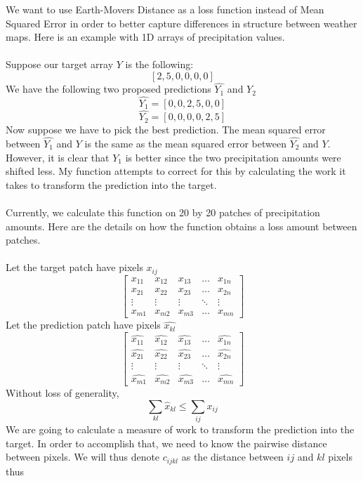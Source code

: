 \documentclass[twoside,11pt]{article}
\theoremstyle{definition}
\begin{document}
We want to use Earth-Movers Distance as a loss function instead of Mean Squared Error in order to better capture differences in structure between weather maps. Here is an example with 1D arrays of precipitation values. \\
\\
Suppose our target array $Y$ is the following:
\[
[2,5,0,0,0,0]
\]
We have the following two proposed predictions $\hat{Y_1}$ and $\hat{Y_2}$
\[
\hat{Y_1} =[0,0,2,5,0,0]
\]
\[
\hat{Y_2} = [0,0,0,0,2,5]
\]
Now suppose we have to pick the best prediction. The mean squared error between $\hat{Y_1}$ and $Y$ is the same as the mean squared error between  $\hat{Y_2}$ and $Y$. However, it is clear that $Y_1$ is better since the two precipitation amounts were shifted less. My function attempts to correct for this by calculating the work it takes to transform the prediction into the target. \\
\\
Currently, we calculate this function on 20 by 20 patches of precipitation amounts. Here are the details on how the function obtains a loss amount between patches.\\
\\
Let the target patch have pixels $x_{ij}$\\
\[
\begin{bmatrix}
    x_{11} & x_{12} & x_{13} & \dots  & x_{1n} \\
    x_{21} & x_{22} & x_{23} & \dots  & x_{2n} \\
    \vdots & \vdots & \vdots & \ddots & \vdots \\
    x_{m1} & x_{m2} & x_{m3} & \dots  & x_{mn}
\end{bmatrix}
\]
Let the prediction patch have pixels $\hat{x_{kl}}$\\
\[
\begin{bmatrix}
    \hat{x_{11}} & \hat{x_{12}} & \hat{x_{13}} & \dots  & \hat{x_{1n}} \\
    \hat{x_{21}} & \hat{x_{22}} & \hat{x_{23}} & \dots  & \hat{x_{2n}} \\
    \vdots & \vdots & \vdots & \ddots & \vdots \\
    \hat{x_{m1}} & \hat{x_{m2}} & \hat{x_{m3}} & \dots  & \hat{x_{mn}}
\end{bmatrix}
\]
Without loss of generality, 
\[
\sum_{kl}{\hat{x}_{kl}} \leq \sum_{ij}{x_{ij}}
\]
We are going to calculate a measure of work to transform the prediction into the target. In order to accomplish that, we need to know the pairwise distance between pixels. We will thus denote $c_{ijkl}$ as the distance between $ij$ and $kl$ pixels thus
\end{document}
